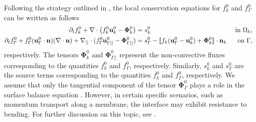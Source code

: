 Following the strategy outlined in \citep{ishii2010thermo,bothe2022sharp}, the local conservation equations for $f_k^0$ and $f_\Gamma^0$ can be written as follows
\begin{align}
    \label{eq:dt_f_k}
    \partial_t f_k^0
    +\mathbf{\nabla}\cdot \left(
        f_k^0\textbf{u}_k^0
        - \mathbf{\Phi}_k^0
        \right)
    &= 
    s_k^0
    & \text{ in } \Omega_k,&\\
    \partial_t f_\Gamma^0 
    + f_\Gamma^0 (\textbf{u}_\Gamma^0 \cdot \textbf{n})(\mathbf{\nabla}\cdot \textbf{n})
    +\mathbf{\nabla}_{||}\cdot
    (f_\Gamma^0 \textbf{u}_{\Gamma||}^0
        - \mathbf{\Phi}_{\Gamma||}^0 )
    &= 
    s_\Gamma^0
    - \llbracket 
       f_k (\textbf{u}_\Gamma^0 - \textbf{u}_k^0)
       + \mathbf{\Phi}_k^0
     \rrbracket \cdot \textbf{n}_k 
    & \text{ on } \Gamma,&
    \label{eq:dt_f_I}
\end{align}
respectively. The tensors $\mathbf{\Phi}_k^0$ and $\mathbf{\Phi}_{\Gamma||}^0$ represent the non-convective fluxes corresponding to the quantities $f_k^0$ and $f_\Gamma^0$, respectively. Similarly, $s_k^0$ and $s_\Gamma^0$ are the source terms corresponding to the quantities $f_k^0$ and $f_\Gamma^0$, respectively. We assume that only the tangential component of the tensor $\mathbf{\Phi}_{\Gamma}^0$ plays a role in the surface balance equation \citep{bothe2022sharp}. However, in certain specific scenarios, such as momentum transport along a membrane, the interface may exhibit resistance to bending. For further discussion on this topic, see \citet{jaensson2021}. %
